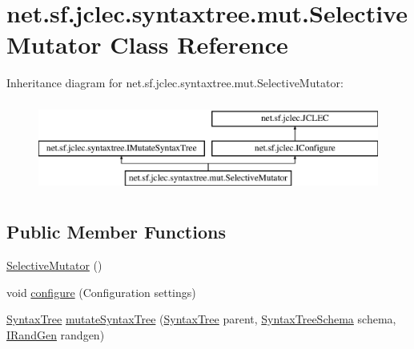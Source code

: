\hypertarget{classnet_1_1sf_1_1jclec_1_1syntaxtree_1_1mut_1_1_selective_mutator}{\section{net.\-sf.\-jclec.\-syntaxtree.\-mut.\-Selective\-Mutator Class Reference}
\label{classnet_1_1sf_1_1jclec_1_1syntaxtree_1_1mut_1_1_selective_mutator}
}
Inheritance diagram for net.\-sf.\-jclec.\-syntaxtree.\-mut.\-Selective\-Mutator\-:\begin{figure}[H]
\begin{center}
\leavevmode
\includegraphics[height=3.000000cm]{classnet_1_1sf_1_1jclec_1_1syntaxtree_1_1mut_1_1_selective_mutator}
\end{center}
\end{figure}
\subsection*{Public Member Functions}
\begin{DoxyCompactItemize}
\item 
\hyperlink{classnet_1_1sf_1_1jclec_1_1syntaxtree_1_1mut_1_1_selective_mutator_a53c051349cf453211ce2b56a263998fe}{Selective\-Mutator} ()
\item 
void \hyperlink{classnet_1_1sf_1_1jclec_1_1syntaxtree_1_1mut_1_1_selective_mutator_ad1e56d2da4e031a14721749877767e49}{configure} (Configuration settings)
\item 
\hyperlink{classnet_1_1sf_1_1jclec_1_1syntaxtree_1_1_syntax_tree}{Syntax\-Tree} \hyperlink{classnet_1_1sf_1_1jclec_1_1syntaxtree_1_1mut_1_1_selective_mutator_a3b8db22a61953ae41ea6ef140dede05c}{mutate\-Syntax\-Tree} (\hyperlink{classnet_1_1sf_1_1jclec_1_1syntaxtree_1_1_syntax_tree}{Syntax\-Tree} parent, \hyperlink{classnet_1_1sf_1_1jclec_1_1syntaxtree_1_1_syntax_tree_schema}{Syntax\-Tree\-Schema} schema, \hyperlink{interfacenet_1_1sf_1_1jclec_1_1util_1_1random_1_1_i_rand_gen}{I\-Rand\-Gen} randgen)
\end{DoxyCompactItemize}
